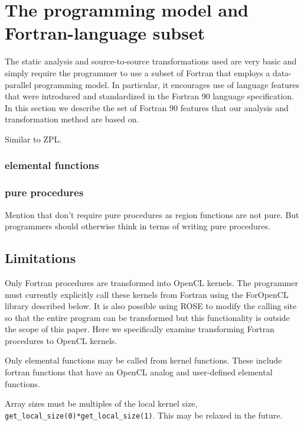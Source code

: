 \documentclass[10pt, conference, compsocconf]{IEEEtran}
\begin{document}
\section{The programming model and Fortran-language subset}

The static analysis and source-to-source transformations used are very basic
and simply require the programmer to use a subset of Fortran that employs
a data-parallel programming model.  In particular, it encourages use of language features that
were introduced and standardized in the Fortran 90 language specification.  In this section we describe the
set of Fortran 90 features that our analysis and transformation method are based on.

Similar to ZPL.


%
% 

\subsubsection{elemental functions}

\subsubsection{pure procedures}

Mention that don't require pure procedures as region functions are not pure.
But programmers should otherwise think in terms of writing pure procedures.

\subsection{Limitations}

Only Fortran procedures are transformed into OpenCL kernels.  The programmer
must currently explicitly call these kernels from Fortran using the ForOpenCL
library described below.  It is also possible using ROSE to modify the calling
site so that the entire program can be transformed but this functionality is
outside the scope of this paper.  Here we specifically examine transforming
Fortran procedures to OpenCL kernels.

Only elemental functions may be called from kernel functions.  These include
fortran functions that have an OpenCL analog and user-defined elemental functions.

Array sizes must be multiples of the local kernel size,
{\tt get\_local\_size(0)*get\_local\_size(1)}.  This may be relaxed in the future.
\end{document}
